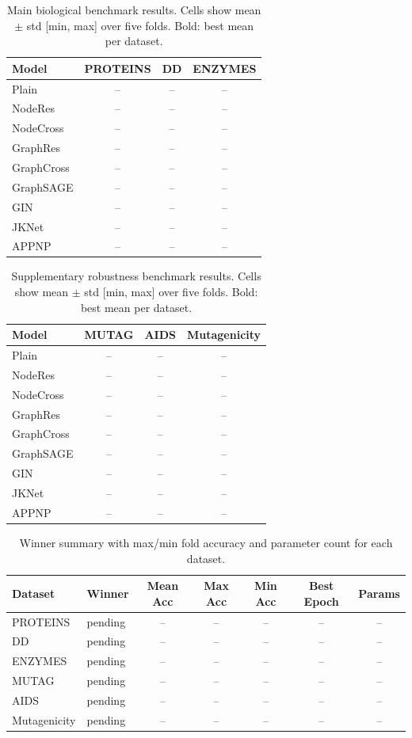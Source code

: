 \begin{table}[t]
\centering
\footnotesize
\setlength{\tabcolsep}{4pt}
\caption{Main biological benchmark results. Cells show mean $\pm$ std [min, max] over five folds. Bold: best mean per dataset.}
\label{tab:all_results_1}
\begin{tabular}{lccc}
\toprule
Model & PROTEINS & DD & ENZYMES \\
\midrule
Plain & -- & -- & -- \\
NodeRes & -- & -- & -- \\
NodeCross & -- & -- & -- \\
GraphRes & -- & -- & -- \\
GraphCross & -- & -- & -- \\
GraphSAGE & -- & -- & -- \\
GIN & -- & -- & -- \\
JKNet & -- & -- & -- \\
APPNP & -- & -- & -- \\
\bottomrule
\end{tabular}
\end{table}

\begin{table}[t]
\centering
\footnotesize
\setlength{\tabcolsep}{4pt}
\caption{Supplementary robustness benchmark results. Cells show mean $\pm$ std [min, max] over five folds. Bold: best mean per dataset.}
\label{tab:all_results_2}
\begin{tabular}{lccc}
\toprule
Model & MUTAG & AIDS & Mutagenicity \\
\midrule
Plain & -- & -- & -- \\
NodeRes & -- & -- & -- \\
NodeCross & -- & -- & -- \\
GraphRes & -- & -- & -- \\
GraphCross & -- & -- & -- \\
GraphSAGE & -- & -- & -- \\
GIN & -- & -- & -- \\
JKNet & -- & -- & -- \\
APPNP & -- & -- & -- \\
\bottomrule
\end{tabular}
\end{table}

\begin{table}[t]
\centering
\small
\caption{Winner summary with max/min fold accuracy and parameter count for each dataset.}
\label{tab:all_winners}
\begin{tabular}{l l c c c c c}
\toprule
Dataset & Winner & Mean Acc & Max Acc & Min Acc & Best Epoch & Params \\
\midrule
PROTEINS & pending & -- & -- & -- & -- & -- \\
DD & pending & -- & -- & -- & -- & -- \\
ENZYMES & pending & -- & -- & -- & -- & -- \\
MUTAG & pending & -- & -- & -- & -- & -- \\
AIDS & pending & -- & -- & -- & -- & -- \\
Mutagenicity & pending & -- & -- & -- & -- & -- \\
\bottomrule
\end{tabular}
\end{table}

